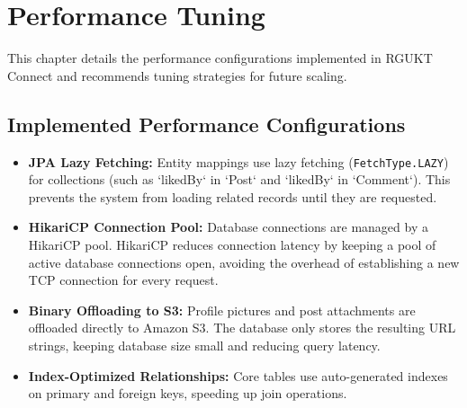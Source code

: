 \chapter{Performance Tuning}
\label{ch:performance}

This chapter details the performance configurations implemented in RGUKT Connect and recommends tuning strategies for future scaling.

\section{Implemented Performance Configurations}
\begin{itemize}
    \item \textbf{JPA Lazy Fetching:} Entity mappings use lazy fetching (\texttt{FetchType.LAZY}) for collections (such as `likedBy` in `Post` and `likedBy` in `Comment`). This prevents the system from loading related records until they are requested.
    \item \textbf{HikariCP Connection Pool:} Database connections are managed by a HikariCP pool. HikariCP reduces connection latency by keeping a pool of active database connections open, avoiding the overhead of establishing a new TCP connection for every request.
    \item \textbf{Binary Offloading to S3:} Profile pictures and post attachments are offloaded directly to Amazon S3. The database only stores the resulting URL strings, keeping database size small and reducing query latency.
    \item \textbf{Index-Optimized Relationships:} Core tables use auto-generated indexes on primary and foreign keys, speeding up join operations.
\end{itemize}

